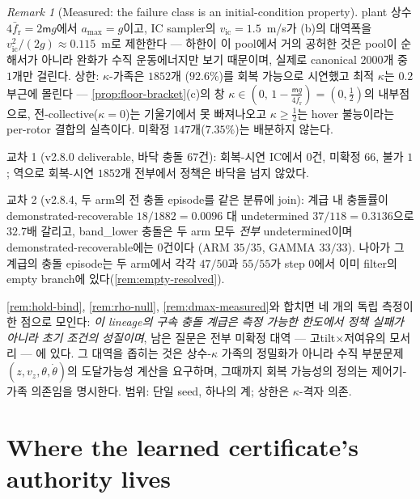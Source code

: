 \documentclass[11pt]{article}
\theoremstyle{plain}
\theoremstyle{definition}
\theoremstyle{remark}
\newtheorem{remark}[theorem]{Remark}
\newcommand{\mass}{\mathsf m}
\begin{document}
\begin{remark}[Measured: the failure class is an initial-condition property]\label{rem:floor-bracket}
plant 상수 $4\bar f_{\mathrm r}=2\mass g$에서 $a_{\max}=g$이고, IC sampler의
$v_{\mathrm{ic}}=1.5$~m/s가 (b)의 대역폭을 $v_{\mathrm{ic}}^2/(2g)\approx0.115$~m로 제한한다
--- 하한이 이 pool에서 거의 공허한 것은 pool이 순해서가 아니라 완화가 수직 운동에너지만 보기
때문이며, 실제로 canonical $2000$개 중 $1$개만 걸린다. 상한: $\kappa$-가족은 $1852$개
($92.6\%$)를 회복 가능으로 시연했고 최적 $\kappa$는 $0.2$ 부근에 몰린다 ---
\cref{prop:floor-bracket}(c)의 창 $\kappa\in(0,\,1-\tfrac{\mass g}{4\bar f_{\mathrm r}})
=(0,\tfrac12)$의 내부점으로, 전-collective($\kappa=0$)는 기울기에서 못 빠져나오고
$\kappa\ge\tfrac12$는 hover 불능이라는 per-rotor 결합의 실측이다. 미확정 $147$개($7.35\%$)는
배분하지 않는다.

교차 1 (v2.8.0 deliverable, 바닥 충돌 $67$건): 회복-시연 IC에서 $0$건, 미확정 $66$, 불가 $1$;
역으로 회복-시연 $1852$개 전부에서 정책은 바닥을 넘지 않았다.

교차 2 (v2.8.4, 두 arm의 전 충돌 episode를 같은 분류에 join): 계급 내 충돌률이
demonstrated-recoverable $18/1882=0.0096$ 대 undetermined $37/118=0.3136$으로 $32.7$배 갈리고,
band\_lower 충돌은 두 arm 모두 \emph{전부} undetermined이며 demonstrated-recoverable에는 $0$건이다
(ARM $35/35$, GAMMA $33/33$). 나아가 그 계급의 충돌 episode는 두 arm에서 각각 $47/50$과 $55/55$가
step $0$에서 이미 filter의 empty branch에 있다(\cref{rem:empty-resolved}).

\cref{rem:hold-bind}, \cref{rem:rho-null}, \cref{rem:dmax-measured}와 합치면 네 개의 독립 측정이
한 점으로 모인다: \emph{이 lineage의 구속 충돌 계급은 측정 가능한 한도에서 정책 실패가 아니라
초기 조건의 성질이며}, 남은 질문은 전부 미확정 대역 --- 고tilt$\times$저여유의 모서리 --- 에 있다.
그 대역을 좁히는 것은 상수-$\kappa$ 가족의 정밀화가 아니라 수직 부분문제
$(z,v_z,\theta,\dot\theta)$의 도달가능성 계산을 요구하며, 그때까지 회복 가능성의 정의는
제어기-가족 의존임을 명시한다. 범위: 단일 seed, 하나의 계; 상한은 $\kappa$-격자 의존.
\end{remark}

\section{Where the learned certificate's authority lives}\label{sec:channel}
\end{document}
